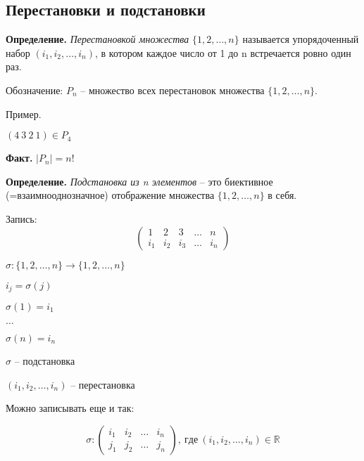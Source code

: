 \subsection{Перестановки и подстановки}

\textbf{Определение.} \textit{Перестановкой множества} $\{ 1, 2, \dots, n \} $ называется упорядоченный набор $(i_1, i_2, \dots, i_n)$, в котором каждое число от 1 до n встречается ровно один раз.

Обозначение: $P_n$ -- множество всех перестановок множества $\{ 1, 2, \dots, n \} $. 

\vspace{\baselineskip}
Пример. 

$(4 \ 3 \ 2 \ 1) \in P_4$ 

\vspace{\baselineskip}
\textbf{Факт.} $|P_n| = n!$

\vspace{\baselineskip}
\textbf{Определение.} \textit{Подстановка из n элементов} -- это биективное (=взаимнооднозначное) отображение множества $\{ 1, 2, \dots, n \} $ в себя.

Запись: \begin{equation*}\begin{pmatrix} 1 & 2 & 3 & \dots & n \\
i_1 & i_2 & i_3 & \dots & i_n \end{pmatrix} \end{equation*}

$\sigma : \{ 1, 2, \dots, n \} \rightarrow \{ 1, 2, \dots, n \}$

\vspace{\baselineskip}
$i_j = \sigma (j)$ 

\vspace{\baselineskip}
$\sigma (1) = i_1$

$\dots$

$\sigma (n) = i_n$

\vspace{\baselineskip}
$\sigma$ -- подстановка

$(i_1, i_2, \dots, i_n)$ -- перестановка

\vspace{\baselineskip}
Можно записывать еще и так:

\begin{equation*} \sigma : \begin{pmatrix} i_1 & i_2 & \dots & i_n \\ j_1 & j_2 & \dots & j_n \end{pmatrix}, \ где \ (i_1, i_2, \dots, i_n) \in \mathbb{R}
\end{equation*}

